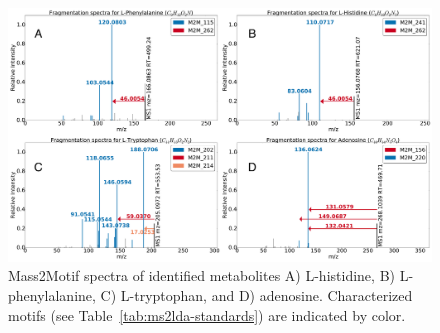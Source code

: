 \begin{figure}[!htbp]
\centering\includegraphics[width=1.0\linewidth]{07-lda/figures/standards.pdf}
\centering\caption{Mass2Motif spectra of identified metabolites A) L-histidine, B) L-phenylalanine, C) L-tryptophan, and D) adenosine. Characterized motifs (see Table~\ref{tab:ms2lda-standards}) are indicated by color.\label{fig:m2lda-standards}}
\end{figure}


